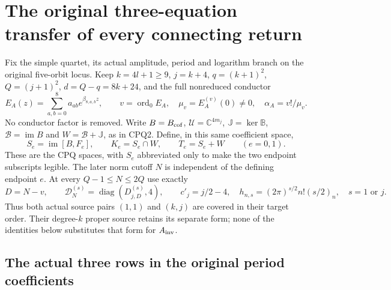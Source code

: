\documentclass[11pt,a4paper]{article}
\begin{document}
\label{MTBUILD:GRA_COMPLETE_PREREQUISITE:end}

\clearpage
\label{MTBUILD:PRT_COMPLETE_PREREQUISITE:start}
\clearpage
\label{MPBUILD:PRT_CONNECTING_ENDPOINT_RETURN:start}
\section{The original three-equation transfer of every connecting return}
\label{sec:PRT}

Fix the simple quartet, its actual amplitude, period and logarithm branch
on the original five-orbit locus. Keep $k=4l+1\ge9$, $j=k+4$,
$q=(k+1)^2$, $Q=(j+1)^2$, $d=Q-q=8k+24$, and the full
nonreduced conductor
\[
 E_A(z)=\sum_{a,b=0}^8a_{ab}e^{\beta_{8,a,b}z},\qquad
 v=\operatorname{ord}_0E_A,\quad\mu_v=E_A^{(v)}(0)\ne0,
 \quad\alpha_A=v!/\mu_v.
 \tag{PRT1}
\]
No conductor factor is removed. Write $B=B_{\rm cof}$,
$\mathcal U=\mathbb C^{4m_j}$, $\mathbb J=\ker\mathbb B$,
$\mathscr B=\operatorname{im}B$ and $W=\mathscr B+\mathbb J$,
as in CPQ2. Define, in this same coefficient space,
\[
 S_e=\operatorname{im}[B,F_e],\qquad K_e=S_e\cap W,
 \qquad T_e=S_e+W\qquad(e=0,1).
 \tag{PRT2}
\]
These are the CPQ spaces, with $S_e$ abbreviated only to make the
two endpoint subscripts legible. The later norm cutoff $N$ is independent
of the defining endpoint $e$. At every $Q-1\le N\le2Q$ use exactly
\[
 D=N-v,\qquad \mathcal D_N^{(s)}=
 \operatorname{diag}(D_{j,D}^{(s)},4),\qquad
 c'_j=j/2-4,\quad h_{n,s}=(2\pi)^{s/2}n!(s/2)_n,
 \quad s=1\text{ or }j.
 \tag{PRT3}
\]
Thus both actual source pairs $(1,1)$ and $(k,j)$ are covered in
their target order. Their degree-$k$ proper source retains its separate
form; none of the identities below substitutes that form for $A_{\rm inv}$.

\subsection{The actual three rows in the original period coefficients}
\end{document}
